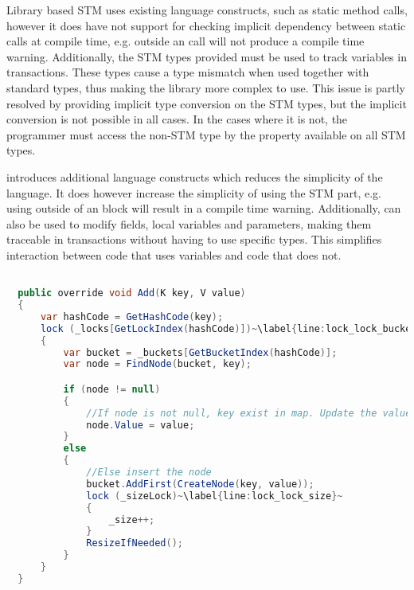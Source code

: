 Library based \ac{STM} uses existing language constructs, such as static method calls, however it does have not support for checking implicit dependency between static calls at compile time, e.g.  outside an  call will not produce a compile time warning. Additionally, the \ac{STM} types provided must be used to track variables in transactions. These types cause a type mismatch when used together with standard types, thus making the library more complex to use. This issue is partly resolved by providing implicit type conversion on the \ac{STM} types, but the implicit conversion is not possible in all cases. In the cases where it is not, the programmer must access the non-\ac{STM} type by the  property available on all \ac{STM} types. 

\stmnamesp introduces additional language constructs which reduces the simplicity of the language. It does however increase the simplicity of using the \ac{STM} part, e.g. using  outside of an  block will result in a compile time warning. Additionally,  can also be used to modify fields, local variables and parameters, making them traceable in transactions without having to use specific types. This simplifies interaction between code that uses  variables and code that does not. 

\begin{lstlisting}[float,label=lst:lock_add_hashmap,
  caption={ConcurrentHashMap \bscode{Add} Method - Locking},
  language=Java,  
  showspaces=false,
  showtabs=false,
  breaklines=true,
  showstringspaces=false,
  breakatwhitespace=true,
  escapechar=~,
  commentstyle=\color{greencomments},
  keywordstyle=\color{bluekeywords},
  stringstyle=\color{redstrings},
  morekeywords={atomic, retry, orelse, var, get, set, ref, out}]  % Start your code-block

  public override void Add(K key, V value)
  {
      var hashCode = GetHashCode(key);
      lock (_locks[GetLockIndex(hashCode)])~\label{line:lock_lock_bucket}~
      {
          var bucket = _buckets[GetBucketIndex(hashCode)];
          var node = FindNode(bucket, key);

          if (node != null)
          {
              //If node is not null, key exist in map. Update the value
              node.Value = value;
          }
          else
          {
              //Else insert the node
              bucket.AddFirst(CreateNode(key, value));
              lock (_sizeLock)~\label{line:lock_lock_size}~
              {
                  _size++;
              }
              ResizeIfNeeded();
          }
      }
  }
\end{lstlisting}

